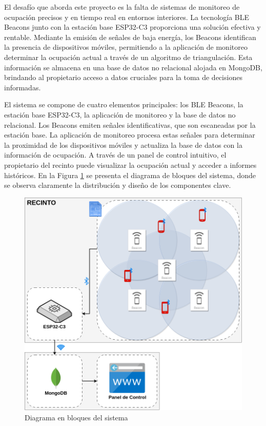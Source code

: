 \documentclass[
11pt, %
]{charter}
\begin{document}
\setlength{\parindent}{1cm}El desafío que aborda este proyecto es la falta de sistemas de monitoreo de ocupación precisos y en tiempo real en entornos interiores. La tecnología BLE Beacons junto con la estación base ESP32-C3 proporciona una solución efectiva y rentable. Mediante la emisión de señales de baja energía, los Beacons identifican la presencia de dispositivos móviles, permitiendo a la aplicación de monitoreo determinar la ocupación actual a través de un algoritmo de triangulación. Esta información se almacena en una base de datos no relacional alojada en MongoDB, brindando al propietario acceso a datos cruciales para la toma de decisiones informadas.

\setlength{\parindent}{1cm}El sistema se compone de cuatro elementos principales: los BLE Beacons, la estación base ESP32-C3, la aplicación de monitoreo y la base de datos no relacional. Los Beacons emiten señales identificativas, que son escaneadas por la estación base. La aplicación de monitoreo procesa estas señales para determinar la proximidad de los dispositivos móviles y actualiza la base de datos con la información de ocupación. A través de un panel de control intuitivo, el propietario del recinto puede visualizar la ocupación actual y acceder a informes históricos. En la Figura \ref{fig:diagBloques} se presenta el diagrama de bloques del sistema, donde se observa claramente la distribución y diseño de los componentes clave.

\begin{figure}[htpb]
\centering 
\includegraphics[width=.7\textwidth]{./Figuras/diagBloques.png}
\caption{Diagrama en bloques del sistema}
\label{fig:diagBloques}
\end{figure}
\end{document}
